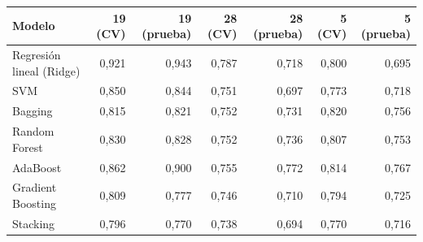 \begin{tabular}{lrrrrrr}
\toprule
Modelo & 19 (CV) & 19 (prueba) & 28 (CV) & 28 (prueba) & 5 (CV) & 5 (prueba) \\
\midrule
Regresión lineal (Ridge) & 0,921 & 0,943 & 0,787 & 0,718 & 0,800 & 0,695 \\
SVM & 0,850 & 0,844 & 0,751 & 0,697 & 0,773 & 0,718 \\
Bagging & 0,815 & 0,821 & 0,752 & 0,731 & 0,820 & 0,756 \\
Random Forest & 0,830 & 0,828 & 0,752 & 0,736 & 0,807 & 0,753 \\
AdaBoost & 0,862 & 0,900 & 0,755 & 0,772 & 0,814 & 0,767 \\
Gradient Boosting & 0,809 & 0,777 & 0,746 & 0,710 & 0,794 & 0,725 \\
Stacking & 0,796 & 0,770 & 0,738 & 0,694 & 0,770 & 0,716 \\
\bottomrule
\end{tabular}
